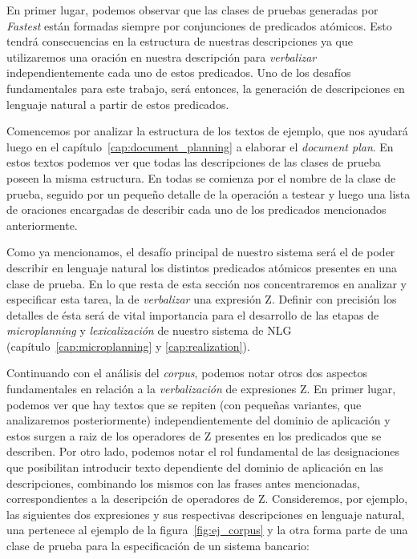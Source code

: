 En primer lugar, podemos observar que las clases de pruebas generadas por \emph{Fastest} están formadas siempre por conjunciones de predicados atómicos. Esto tendrá consecuencias en la estructura de nuestras descripciones ya que utilizaremos una oración en nuestra descripción para \emph{verbalizar} independientemente cada uno de estos predicados. Uno de los desafíos fundamentales para este trabajo, será entonces, la generación de descripciones en lenguaje natural a partir de estos predicados. 

Comencemos por analizar la estructura de los textos de ejemplo, que nos ayudará luego en el capítulo~\ref{cap:document_planning} a elaborar el \emph{document plan}. En estos textos podemos ver que todas las descripciones de las clases de prueba poseen la misma estructura. En todas se comienza por el nombre de la clase de prueba, seguido por un pequeño detalle de la operación a testear y luego una lista de oraciones encargadas de describir cada uno de los predicados mencionados anteriormente. 

Como ya mencionamos, el desafío principal de nuestro sistema será el de poder describir en lenguaje natural los distintos predicados atómicos presentes en una clase de prueba. En lo que resta de esta sección nos concentraremos en analizar y especificar esta tarea, la de \emph{verbalizar} una expresión Z. Definir con precisión los detalles de ésta será de vital importancia para el desarrollo de las etapas de \emph{microplanning} y \emph{lexicalización} de nuestro sistema de NLG (capítulo~\ref{cap:microplanning} y \ref{cap:realization}).

Continuando con el análisis del \emph{corpus}, podemos notar otros dos aspectos fundamentales en relación a la \emph{verbalización} de expresiones Z. En primer lugar, podemos ver que hay textos que se repiten (con pequeñas variantes, que analizaremos posteriormente) independientemente del dominio de aplicación y estos surgen a raiz de los operadores de Z presentes en los predicados que se describen. Por otro lado, podemos notar el rol fundamental de las designaciones que posibilitan introducir texto dependiente del dominio de aplicación en las descripciones, combinando los mismos con las frases antes mencionadas, correspondientes a la descripción de operadores de Z. Consideremos, por ejemplo, las siguientes dos expresiones y sus respectivas descripciones en lenguaje natural, una pertenece al ejemplo de la figura~\ref{fig:ej_corpus} y la otra forma parte de una clase de prueba para la especificación de un sistema bancario:

